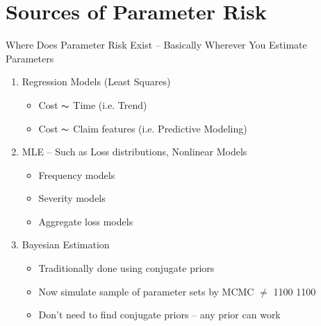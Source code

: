\documentclass[10pt, xcolor=x11names, compress, handout]{beamer}
\begin{document}
\section{Sources of Parameter Risk}
\begin{frame}{Where Does Parameter Risk Exist --  Basically Wherever You Estimate Parameters}
	\begin{enumerate}
		\item<1-> Regression Models (Least Squares)
			\begin{itemize}
				\item<1-> Cost $\thicksim$ Time (i.e. Trend)
				\item<1-> Cost $\thicksim$ Claim features (i.e. Predictive Modeling)
			\end{itemize}
		\item<2-> MLE -- Such as Loss distributions, Nonlinear Models
			\begin{itemize}
				\item<2-> Frequency models
				\item<2-> Severity models
				\item<2-> Aggregate loss models
			\end{itemize}
		\item<3-> Bayesian Estimation
		\begin{itemize}
			\item<2-> Traditionally done using conjugate priors
			\item<2-> Now simulate sample of parameter sets by MCMC $\ne$ 1100 1100
			\item<2-> Don't need to find conjugate priors -- any prior can work
		\end{itemize}		
	\end{enumerate}
\end{frame}

\end{document}
